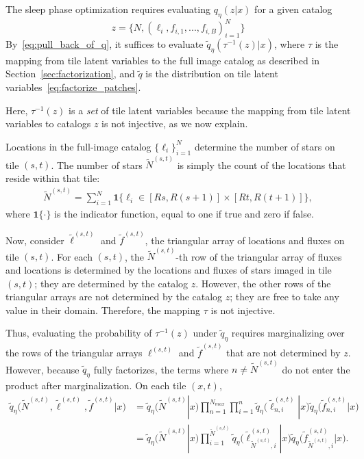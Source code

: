 The sleep phase optimization requires evaluating
$q_\eta(z | x)$ for a given catalog
\[z = \{N, (\ell_i, f_{i,1}, ..., f_{i,B})_{i = 1}^N\}\]
By~\eqref{eq:pull_back_of_q}, 
it suffices to evaluate $\tilde q_\eta(\tau^{-1}(z) | x)$, 
where $\tau$ is the mapping from tile latent variables to the full image catalog as described in Section~\ref{sec:factorization}, 
and $\tilde q$ is the distribution on tile latent variables~\eqref{eq:factorize_patches}. 

Here, $\tau^{-1}(z)$ is a {\itshape set} of tile latent variables because the mapping from tile latent variables to catalogs $z$ is not injective, as we now explain.  

Locations in the full-image catalog $\{\ell_i\}_{i=1}^N$
determine the number of stars on tile $(s,t)$. 
The number of stars $\tilde N^{(s,t)}$ is simply the count of the locations that reside within that tile:
\begin{align}
\tilde N^{(s,t)} = \sum_{i=1}^N 
\mathbf 1 \Big\{\ell_i\in [Rs, R(s+1)] \times [Rt, R(t+1)]\Big\},
\end{align}
where $\mathbf{1}\{\cdot\}$ is the indicator function, equal to one if true and zero if false.

Now, consider $\tilde\ell^{(s, t)}$ and $\tilde f^{(s, t)}$, the triangular array of locations and fluxes on tile $(s,t)$. 
For each $(s,t)$, the $\tilde N^{(s,t)}$-th row 
of the triangular array of fluxes and locations is
determined by the locations and fluxes of stars imaged in tile $(s,t)$; they are determined by the catalog $z$. However, the other rows 
of the triangular arrays are not determined by 
the catalog $z$; they are free to take any value in their domain. Therefore, the mapping $\tau$ is not injective. 

Thus, evaluating the probability of $\tau^{-1}(z)$ under $\tilde q_\eta$ requires marginalizing over the rows of the triangular arrays $\ell^{(s, t)}$ and $\tilde f^{(s, t)}$ that are not determined by $z$. However, 
because $\tilde q_\eta$ fully factorizes, the terms 
where $n \not= \tilde N^{(s,t)}$ do not enter the
product
after marginalization.
On each tile $(x,t)$,
\begin{align}
    \tilde q_\eta\big(\tilde N^{(s, t)}, \tilde \ell^{(s, t)}, \tilde f^{(s, t)} | x\big) &= 
    \tilde q_\eta(\tilde N^{(s,t)} | x) 
    \prod_{n = 1}^{N_{max}}\prod_{i = 1}^{n}
    \tilde q_\eta\big(\tilde \ell_{n,i}^{(s, t)} | x\big)
    \tilde q_\eta\big(\tilde f_{n,i}^{(s, t)} | x\big) \\
    &= \tilde q_\eta(\tilde N^{(s,t)} | x) 
    \prod_{i = 1}^{\tilde N^{(s,t)}}
    \tilde q_\eta\big(\tilde \ell_{\tilde N^{(s,t)},i}^{(s, t)} | x\big)
    \tilde q_\eta\big(\tilde f_{\tilde N^{(s,t)},i}^{(s, t)} | x\big).
\end{align}

